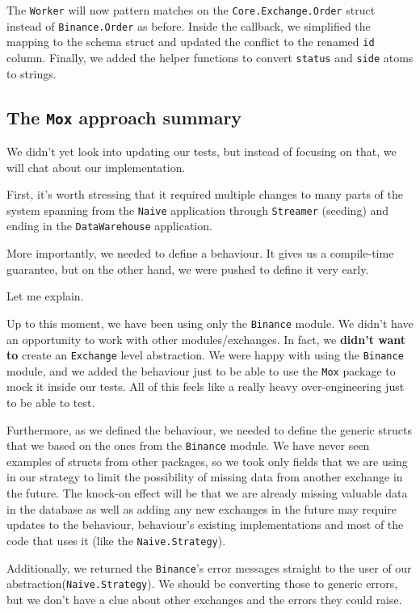 \documentclass[
  oneside]{book}
\begin{document}
The \texttt{Worker} will now pattern matches on the \texttt{Core.Exchange.Order} struct instead of \texttt{Binance.Order} as before. Inside the callback, we simplified the mapping to the schema struct and updated the conflict to the renamed \texttt{id} column. Finally, we added the helper functions to convert \texttt{status} and \texttt{side} atoms to strings.

\subsection{\texorpdfstring{The \texttt{Mox} approach summary}{The Mox approach summary}}\label{the-mox-approach-summary}

We didn't yet look into updating our tests, but instead of focusing on that, we will chat about our implementation.

First, it's worth stressing that it required multiple changes to many parts of the system spanning from the \texttt{Naive} application through \texttt{Streamer} (seeding) and ending in the \texttt{DataWarehouse} application.

More importantly, we needed to define a behaviour. It gives us a compile-time guarantee, but on the other hand, we were pushed to define it very early.

Let me explain.

Up to this moment, we have been using only the \texttt{Binance} module. We didn't have an opportunity to work with other modules/exchanges. In fact, we \textbf{didn't want to} create an \texttt{Exchange} level abstraction. We were happy with using the \texttt{Binance} module, and we added the behaviour just to be able to use the \texttt{Mox} package to mock it inside our tests. All of this feels like a really heavy over-engineering just to be able to test.

Furthermore, as we defined the behaviour, we needed to define the generic structs that we based on the ones from the \texttt{Binance} module. We have never seen examples of structs from other packages, so we took only fields that we are using in our strategy to limit the possibility of missing data from another exchange in the future. The knock-on effect will be that we are already missing valuable data in the database as well as adding any new exchanges in the future may require updates to the behaviour, behaviour's existing implementations and most of the code that uses it (like the \texttt{Naive.Strategy}).

Additionally, we returned the \texttt{Binance}'s error messages straight to the user of our abstraction(\texttt{Naive.Strategy}). We should be converting those to generic errors, but we don't have a clue about other exchanges and the errors they could raise.
\end{document}
